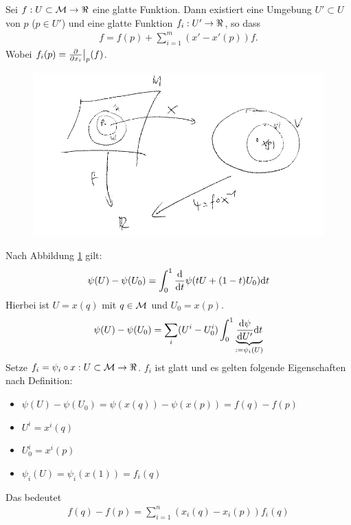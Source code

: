 \begin{lem}
\label{lem:DarstellungBasisTPM}
Sei $f: U \subset \mfk \to \real$ eine glatte Funktion.
Dann existiert eine Umgebung $U' \subset U$ von $p$ ($p \in U'$) und eine glatte Funktion
$f_i: U' \to \real$, so dass
\begin{align}
f = f(p) + \sum_{i=1}^{m} ( x' - x'(p)) f.
\end{align}
Wobei $f_i (p) = \pdv{x_i}\big\vert_{p} (f)$.
\end{lem}

\begin{bew} \leavevmode
\begin{figure}[h]
\centering
\includegraphics[width=0.8\linewidth]{figures/scan/lemma22.png}
\label{img:lemmaDarstellungBasisTPM}
\end{figure}
Nach Abbildung \ref{img:lemmaDarstellungBasisTPM} gilt:
\begin{align}
\psi(U) - \psi(U_0) = \int^1_0 \dv{t} \psi(t U + (1- t) U_0) \dd t
\end{align}
Hierbei ist $U=x(q)$ mit $q \in \mathcal{M}$ und $U_0 = x(p)$.
\begin{align}
\psi(U) - \psi(U_0) = \sum_i (U^i- U^i_0) \int^1_0 \underbrace{\dv{\psi}{U'} (t U + (1 - t) U_0) \dd t}_{:= \psi_i (U)}
\end{align}
Setze $f_i = \psi_i \circ x : U \subset \mfk \to \real$.
$f_i$ ist glatt und es gelten folgende Eigenschaften nach Definition:
\begin{itemize}
\item $\psi(U)- \psi(U_0) = \psi(x(q)) - \psi(x(p)) = f(q)- f(p)$
\item $U^i = x^i (q)$
\item $U_0^i = x^i(p)$
\item $\psi_i (U) = \psi_i (x(1)) = f_i(q)$
\end{itemize}
Das bedeutet
\begin{align}
f(q)- f(p) = \sum_{i=1}^n (x_i (q) - x_i (p)) f_i(q)

\end{align}
\end{bew}
